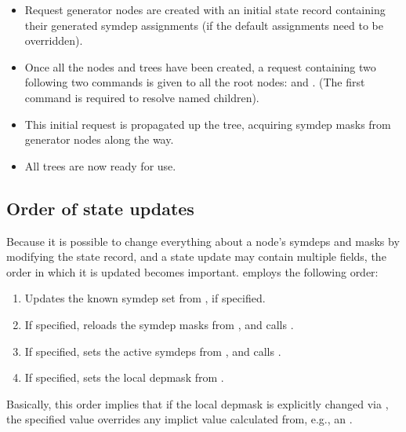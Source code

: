 \documentclass[10pt,twoside]{book}
\begin{document}
  \begin{itemize}
  
  \item Request generator nodes are created with an initial state record
    containing their generated symdep assignments (if the default assignments
    need to be overridden).
    
  \item Once all the nodes and trees have been created, a request containing
    two following two commands is given to all the root nodes:
     and . (The first command is
    required to resolve named children).
    
  \item This initial request is propagated up the tree, acquiring symdep masks
    from generator nodes along the way. 
    
  \item All trees are now ready for use.
  
  \end{itemize}

\subsection{Order of state updates}

  Because it is possible to change everything about a node's symdeps and masks
  by modifying the state record, and a state update may contain multiple
  fields, the order in which it is updated becomes important.
   employs the following order:

  \begin{enumerate}
  
  \item Updates the known symdep set from , if specified.
  
  \item If specified, reloads the symdep masks from , and
    calls .
    
  \item If specified, sets the active symdeps from , and
    calls .
    
  \item If specified, sets the local depmask from .
  
  \end{enumerate}
  
  Basically, this order implies that if the local depmask is explicitly changed
  via , the specified value overrides any implict value
  calculated from, e.g., an .
  
\end{document}
